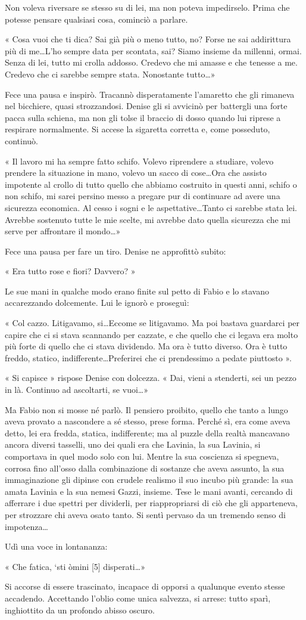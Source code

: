 Non voleva riversare se stesso su di lei, ma non poteva impedirselo. Prima che potesse pensare qualsiasi cosa, cominciò a parlare.

« Cosa vuoi che ti dica? Sai già più o meno tutto, no? Forse ne sai addirittura più di me\ldots L'ho sempre data per scontata, sai? Siamo insieme da millenni, ormai. Senza di lei, tutto mi crolla addosso. Credevo che mi amasse e che tenesse a me. Credevo che ci sarebbe sempre stata. Nonostante tutto\ldots »

Fece una pausa e inspirò. Tracannò disperatamente l'amaretto che gli rimaneva nel bicchiere, quasi strozzandosi. Denise gli si avvicinò per battergli una forte pacca sulla schiena, ma non gli tolse il braccio di dosso quando lui riprese a respirare normalmente. Si accese la sigaretta corretta e, come posseduto, continuò.

« Il lavoro mi ha sempre fatto schifo. Volevo riprendere a studiare, volevo prendere la situazione in mano, volevo un sacco di cose\ldots Ora che assisto impotente al crollo di tutto quello che abbiamo costruito in questi anni, schifo o non schifo, mi sarei persino messo a pregare pur di continuare ad avere una sicurezza economica. Al cesso i sogni e le aspettative\ldots Tanto ci sarebbe stata lei. Avrebbe sostenuto tutte le mie scelte, mi avrebbe dato quella sicurezza che mi serve per affrontare il mondo\ldots »

Fece una pausa per fare un tiro. Denise ne approfittò subito:

« Era tutto rose e fiori? Davvero? »

Le sue mani in qualche modo erano finite sul petto di Fabio e lo stavano accarezzando dolcemente. Lui le ignorò e proseguì:

« Col cazzo. Litigavamo, si\ldots Eccome se litigavamo. Ma poi bastava guardarci per capire che ci si stava scannando per cazzate, e che quello che ci legava era molto più forte di quello che ci stava dividendo. Ma ora è tutto diverso. Ora è tutto freddo, statico, indifferente\ldots Preferirei che ci prendessimo a pedate piuttosto ».

« Si capisce » rispose Denise con dolcezza. « Dai, vieni a stenderti, sei un pezzo in là. Continuo ad ascoltarti, se vuoi\ldots »

Ma Fabio non si mosse né parlò. Il pensiero proibito, quello che tanto a lungo aveva provato a nascondere a sé stesso, prese forma. Perché sì, era come aveva detto, lei era fredda, statica, indifferente; ma al puzzle della realtà mancavano ancora diversi tasselli, uno dei quali era che Lavinia, la sua Lavinia, si comportava in quel modo solo con lui. Mentre la sua coscienza si spegneva, corrosa fino all'osso dalla combinazione di sostanze che aveva assunto, la sua immaginazione gli dipinse con crudele realismo il suo incubo più grande: la sua amata Lavinia e la sua nemesi Gazzi, insieme. Tese le mani avanti, cercando di afferrare i due spettri per dividerli, per riappropriarsi di ciò che gli apparteneva, per strozzare chi aveva osato tanto. Si sentì pervaso da un tremendo senso di impotenza\ldots

Udì una voce in lontananza:

« Che fatica, `sti òmini [5] disperati\ldots »

Si accorse di essere trascinato, incapace di opporsi a qualunque evento stesse accadendo. Accettando l'oblio come unica salvezza, si arrese: tutto sparì, inghiottito da un profondo abisso oscuro.
